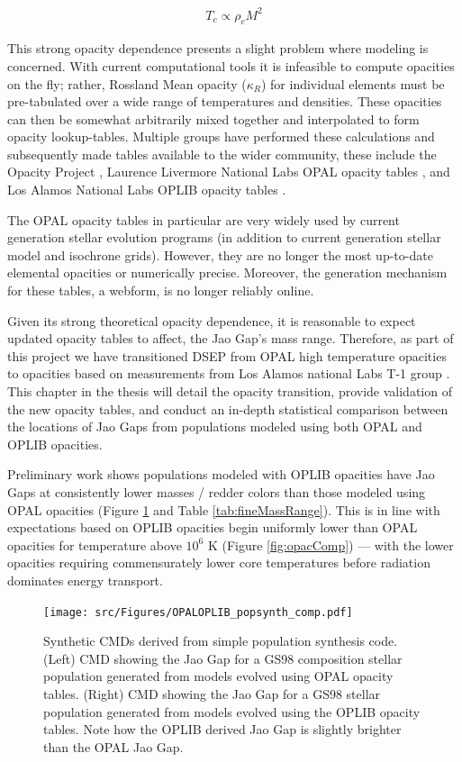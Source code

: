 \begin{align}\label{eqn:TMRelation}
	T_{c} \propto \rho_{c}M^{2}
\end{align}

This strong opacity dependence presents a slight problem where modeling is 
concerned. With current computational tools it is infeasible to compute opacities on the
fly; rather, Rossland Mean opacity ($\kappa_{R}$) for individual elements must
be pre-tabulated over a wide range of temperatures and densities. These
opacities can then be somewhat arbitrarily mixed together and interpolated to
form opacity lookup-tables. Multiple groups have performed these calculations
and subsequently made tables available to the wider community, these include
the Opacity Project \citep[OP][]{Seaton1994}, Laurence Livermore National Labs
OPAL opacity tables \citep{Iglesias1996}, and Los Alamos National Labs OPLIB
opacity tables \citep{Colgan2016}.

The OPAL opacity tables in particular are very widely used by current
generation stellar evolution programs (in addition to current generation
stellar model and isochrone grids). However, they are no longer the most
up-to-date elemental opacities or numerically precise. Moreover, the generation
mechanism for these tables, a webform, is no longer reliably online.  

Given its strong theoretical opacity dependence, it is reasonable to expect
updated opacity tables to affect, the Jao Gap's mass range. Therefore, as part
of this project we have transitioned DSEP from OPAL high temperature opacities
to opacities based on measurements from Los Alamos national Labs T-1 group
\citep[OPLIB][]{Colgan2016}. This chapter in the thesis will detail the opacity
transition, provide validation of the new opacity tables, and conduct an
in-depth statistical comparison between the locations of Jao Gaps from
populations modeled using both OPAL and OPLIB opacities.

Preliminary work shows populations modeled with OPLIB opacities have Jao Gaps
at consistently lower masses / redder colors than those modeled using OPAL
opacities (Figure \ref{fig:JaoGapOPALOPLIB} and Table \ref{tab:fineMassRange}).
This is in line with expectations based on OPLIB opacities begin uniformly
lower than OPAL opacities for temperature above $10^{6}$ K (Figure
\ref{fig:opacComp}) --- with the lower opacities requiring commensurately lower
core temperatures before radiation dominates energy transport. 

\begin{figure}
	\centering
	\texttt{[image: src/Figures/OPALOPLIB\_popsynth\_comp.pdf]}
	\caption{Synthetic CMDs derived from simple population synthesis code.
	(Left) CMD showing the Jao Gap for a GS98 composition stellar population
	generated from models evolved using OPAL opacity tables. (Right) CMD showing
	the Jao Gap for a GS98 stellar population generated from models evolved
	using the OPLIB opacity tables. Note how the OPLIB derived Jao Gap is
	slightly brighter than the OPAL Jao Gap.}
	\label{fig:JaoGapOPALOPLIB}
\end{figure}


